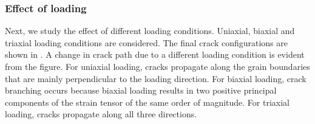 \subsubsection{Effect of loading}

Next, we study the effect of different loading conditions. Uniaxial, biaxial and triaxial loading conditions are considered. The final crack configurations are shown in . A change in crack path due to a different loading condition is evident from the figure. For uniaxial loading, cracks propagate along the grain boundaries that are mainly perpendicular to the loading direction. For biaxial loading, crack branching occurs because biaxial loading results in two positive principal components of the strain tensor of the same order of magnitude. For triaxial loading, cracks propagate along all three directions.
